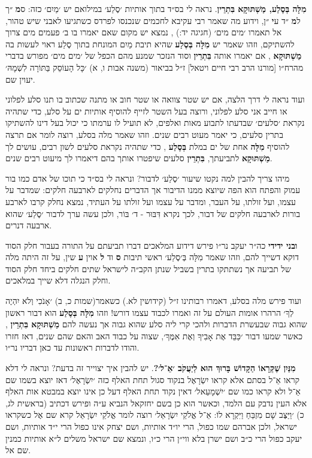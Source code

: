 \documentclass[12pt, openany]{book}
\newcommand{\sethebfont}{
\fontsize{10.5pt}{13.1pt} \selectfont
}
\newcommand{\textblock}[1]{
{\sethebfont #1\\}	
}
\begin{document}
\textblock{\textbf{מִלָּה בְּסֶלַע, מַשְׁתּוּקָא בִּתְרֵין}. נראה לי בס״ד בתוך אותיות ׳סֶלַע׳ במילואם יש ׳מַיִם׳ כזה: ס\textbf{מ} ״ך ל\textbf{מ} ״ד ע\textbf{י} ״ן, וידוע מה שאמר רבי עקיבא לחכמים שנכנסו לפרדס כשתגיעו לאבני שיש טהור, אל תאמרו ׳מים מים׳ {\small (חגיגה יד:)} , נמצא יש מקום שאם יאמרו בו ב׳ פעמים מים צרוך להשתיקם, וזהו שאמר יש \textbf{מִלָּה בְּסֶלַע} שהיא תיבת מַיִם המונחת בתוך סֶלַע ראוי לעשות בה \textbf{מַשְׁתּוּקָא} , אם יאמרו אותה \textbf{בִּתְרֵין} וסוד הנזכר שמנע מהם הכפל של ׳מים מים׳ מפורש בדברי מהרח״ו {\small [מורנו הרב רבי חיים ויטאל]} ז״ל בביאור {\small (משנה אבות ו, א)} ׳כָּל הָעוֹסֵק בַּתּוֹרָה לִשְׁמָהּ׳ יעוין שם.\par ועוד נראה לי דרך הלצה, אם יש שטר צוואה או שטר חוב או מתנה שכתוב בו תנו סלע לפלוני או חייב אני סלע לפלוני, ורוצה בעל השטר לזייף להוסיף אותיות ים על סלע, כדי שתהיה נקראת ׳סלעים׳ שבדעתו לתבוע מאות ואלפים, לא תועיל לו ערמתו כי יכול בעל דינו להשתיקו בתרין סלעים, כי יאמר מעוט רבים שנים. וזהו שאמר מלה בסלע, רוצה לומר אם תרצה להוסיף \textbf{מִלָּה} אחת של ים במלת \textbf{בְּסֶלַע} , כדי שתהיה נקראת סלעים לשון רבים, עושים לך \textbf{מַשְׁתּוּקָא} לתביעתך, \textbf{בִּתְרֵין} סלעים שיפטרו אותך בהם דיאמרו לך מיעוט רבים שנים.\par מיהו צריך להבין למה נקטו שיעור ׳סֶלַע׳ לדבור? ונראה לי בס״ד כי תוכו של אדם כמו בור עמוק והפתח הוא הפה שיוצא ממנו הדיבור אך הדברים נחלקים לארבעה חלקים: שמדבר על עצמו, ועל זולתו, על העבר, ומדבר על עצמו ועל זולתו על העתיד, נמצא נחלק קרבו לארבע בורות לארבעה חלקים של דבור, לכך נקרא דִּבּוּר - ד׳ בּוֹר, ולכן עשה ערך לדבור ׳סֶלַע׳ שהוא ארבעה דנרים.\par \textbf{ובני ידידי} כה״ר יעקב נר״ו פירש דידוע המלאכים דברו תביעתם על התורה בעבור חלק הסוד דוקא דשייך להם, וזהו שאמר מִלָּה בְּ׳סֶלַע׳ ראשי תיבות \textbf{ס} וד \textbf{ל} אוין \textbf{ע} שין, על זה היתה מלה של תביעה אך נשתתקו בתרין בשביל שנתן הקב״ה לישראל שתים חלקים ביחד חלק הסוד וחלק הנגלה דלא שייך במלאכים.\par ועוד פירש מלה בסלע, דאמרו רבותינו ז״ל {\small (קידושין לא.)} כשאמר{\small (שמות כ, ב)} ׳אָנֹכִי וְלֹא יִהְיֶה לְךָ׳ הרהרו אומות העולם על זה ואמרו לכבוד עצמו דורש! וזהו \textbf{מִלָּה בְּסֶלַע} הוא דבור ראשון שהוא גבוה שבעשרת הדברות ולהכי קרי ליה סלע שהוא גבוה אך נעשה להם \textbf{מַשְׁתּוּקָא בִּתְרֵין} , כאשר שמעו דבור ׳כַּבֵּד אֶת אָבִיךָ וְאֶת אִמֶּךָ׳, שצוה על כבוד האב והאם שהם שנים, דאז חזרו והודו לדברות ראשונות עד כאן דבריו נר״ו.}
\textblock{\textbf{מִנַּיִן שֶׁקְּרָאוֹ הַקָּדוֹשׁ בָּרוּךְ הוּא לְיַעֲקֹב ׳אֵ־ל׳?}. יש להבין איך יצוייר זה בדעת? ונראה לי דלא קראו אֵ־ל בסתם אלא קראו יִשְׂרָאֶל בנקוד סגול תחת האלף כזה ׳יִשְׂרָאֶל׳ דאז יוצא בשמו שם אֵ־ל ולא קראו כמו שם ׳יִשְׁמָעֵאל׳ דאין נקוד תחת האלף דעל כן אינו יוצא במבטא אות האלף אלא העין נדבק עם הלמד, וכאשר הוא כן בשם יחזקאל הנביא ע״ה ופירש דכתיב {\small (בראשית לג, כ)} ׳וַיַּצֶּב שָׁם מִזְבֵּחַ וַיִּקְרָא לוֹ: אֵ־ל אֱלֹקֵי יִשְׂרָאֵל׳ רוצה לומר אֱלֹקֵי יִשְׂרָאֵל קרא שם אֶל כשקראו ישראל, ולכן אברהם שמו כפול, הרי יו״ד אותיות, ושם יצחק אינו כפול הרי י״ד אותיות, ושם יעקב כפול הרי כ״ב ושם ישרן בלא ווי״ן הרי כ״ו, ונמצא שם ישראל משלים ל״א אותיות כמנין שם אל.}
\end{document}
